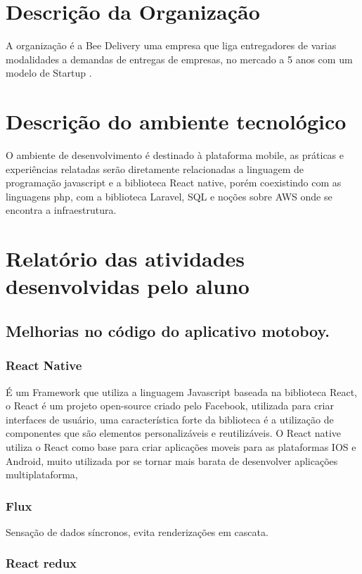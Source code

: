 \documentclass{ufersa}
\begin{document}
\section{Descrição da Organização}
A organização é a Bee Delivery uma empresa que liga entregadores de varias 
modalidades a demandas de entregas de empresas, no mercado a 5 anos com um 
modelo de Startup .

\section{Descrição do ambiente tecnológico}
O ambiente de desenvolvimento é destinado à plataforma mobile, as práticas e experiências relatadas serão diretamente relacionadas a linguagem de programação javascript e a biblioteca React native, porém coexistindo com as linguagens php, com a biblioteca Laravel, SQL e noções sobre AWS onde se encontra a infraestrutura.

\section{Relatório das atividades desenvolvidas pelo aluno}
\subsection{Melhorias no código do aplicativo motoboy.}
\subsubsection{React Native}

	É um Framework que utiliza a linguagem Javascript baseada na biblioteca React, o React é um projeto open-source criado pelo Facebook, utilizada para criar interfaces de usuário, uma característica forte da biblioteca é a utilização de componentes que são elementos personalizáveis e reutilizáveis. O React native utiliza o React como base para criar aplicações moveis para as plataformas IOS e Android, muito utilizada por se tornar mais barata de desenvolver aplicações multiplataforma, 

\subsubsection{Flux}
Sensação de dados síncronos, evita renderizações em cascata.

\subsubsection{React redux}
\end{document}
